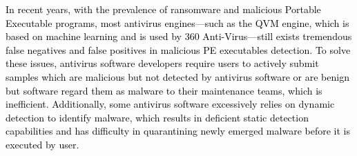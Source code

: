 
\begin{abstractEn}

\textcolor{black}{In recent years, with the prevalence of ransomware and malicious Portable Executable programs, most antivirus engines—such as the QVM engine, which is based on machine learning and is used by 360 Anti-Virus—still exists tremendous false negatives and false positives in malicious PE executables detection. To solve these issues, antivirus software developers require users to actively submit samples which are malicious but not detected by antivirus software or are benign but software regard them as malware to their maintenance teams, which is inefficient. Additionally, some antivirus software excessively relies on dynamic detection to identify malware, which results in deficient static detection capabilities and has difficulty in quarantining newly emerged malware before it is executed by user.}


\end{abstractEn}

